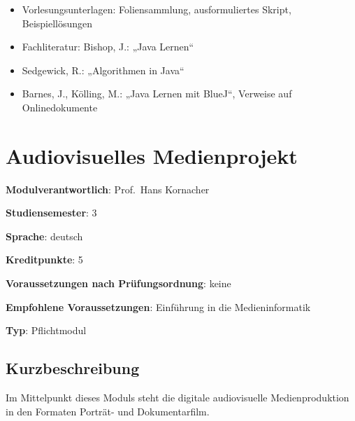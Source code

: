 \begin{itemize}
\tightlist
\item
  Vorlesungsunterlagen: Foliensammlung, ausformuliertes Skript,
  Beispiellösungen
\item
  Fachliteratur: Bishop, J.: „Java Lernen``
\item
  Sedgewick, R.: „Algorithmen in Java``
\item
  Barnes, J., Kölling, M.: „Java Lernen mit BlueJ``, Verweise auf
  Onlinedokumente
\end{itemize}

\chapter{Audiovisuelles
Medienprojekt\label{/mi-2017/modulbeschreibungen-bachelor/BA_AVM}}\label{audiovisuelles-medienprojektpathlabelmi-2017modulbeschreibungen-bachelorbaux5favm}

\begin{modulHead}
\textbf{Modulverantwortlich}: Prof.~Hans
Kornacher
\end{modulHead}
\begin{modulHead}
\textbf{Studiensemester}:
3
\end{modulHead}
\begin{modulHead}
\textbf{Sprache}:
deutsch
\end{modulHead}
\begin{modulHead}
\textbf{Kreditpunkte}:
5
\end{modulHead}
\begin{modulHead}
\textbf{Voraussetzungen nach
Prüfungsordnung}:
keine
\end{modulHead}
\begin{modulHead}
\textbf{Empfohlene
Voraussetzungen}: Einführung in die
Medieninformatik
\end{modulHead}
\begin{modulHead}
\textbf{Typ}:
Pflichtmodul
\end{modulHead}


\section*{Kurzbeschreibung\label{/mi-2017/modulbeschreibungen-bachelor/BA_AVM}}\label{kurzbeschreibungpathlabelmi-2017modulbeschreibungen-bachelorbaux5favm}

Im Mittelpunkt dieses Moduls steht die digitale audiovisuelle
Medienproduktion in den Formaten Porträt- und Dokumentarfilm.

